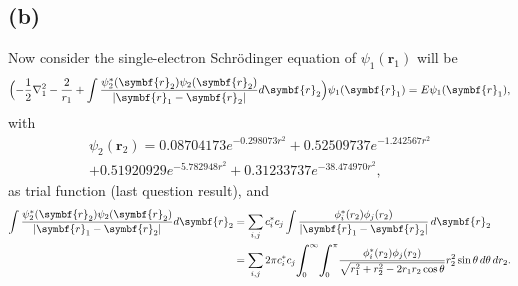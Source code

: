 

\subsection*{(b)}

Now consider the single-electron Schrödinger equation of $\psi_1(\symbf{r}_1)$ will be
%
\begin{equation}
    \Bigl(
    -\frac{1}{2}\nabla_1^2 - \frac{2}{r_1} + \int
    \frac{\psi_2^\ast(\symbf{r}_2)\psi_2(\symbf{r}_2)}{\lvert \symbf{r}_1 - \symbf{r}_2 \rvert} d\symbf{r}_2
    \Bigr)
    \psi_1(\symbf{r}_1) = E \psi_1 (\symbf{r}_1),
\end{equation}
%
with
%
\begin{multline}
    \psi_2(\symbf{r}_2) = 0.08704173 e^{-0.298073 r^2} + 0.52509737 e^{-1.242567 r^2}\\
    + 0.51920929 e^{-5.782948 r^2} + 0.31233737 e^{-38.474970 r^2},
\end{multline}
%
as trial function (last question result), and
%
\begin{equation}
    \begin{aligned}
        \int \frac{\psi_2^\ast(\symbf{r}_2)\psi_2(\symbf{r}_2)}{\lvert \symbf{r}_1 - \symbf{r}_2 \rvert} d\symbf{r}_2
         & = \sum_{i, j} c_i^\ast c_j \int
        \frac{\phi_i^\ast(r_2) \phi_j(r_2)}{\lvert \symbf{r}_1 - \symbf{r}_2 \rvert} \, d\symbf{r}_2 \\
         & = \sum_{i, j} 2\pi c_i^\ast c_j \scaleint{7ex}_{\bs 0}^{\infty} \scaleint{7ex}_{\bs 0}^{\pi}
        \frac{\phi_i^\ast(r_2) \phi_j(r_2)}{\sqrt{r_1^2 + r_2^2 - 2 r_1 r_2 \cos\theta}}
        r_2^2 \sin \theta\, d\theta\, dr_2.
    \end{aligned}
\end{equation}

